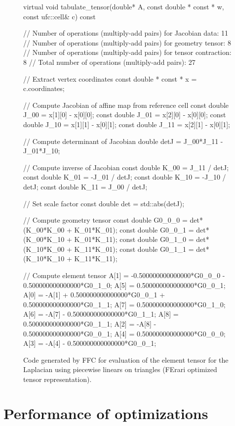 \begin{figure}
  \scriptsize
  \begin{code}
virtual void tabulate_tensor(double* A,
                             const double * const * w,
                             const ufc::cell& c) const
{
  // Number of operations (multiply-add pairs) for Jacobian data:      11
  // Number of operations (multiply-add pairs) for geometry tensor:    8
  // Number of operations (multiply-add pairs) for tensor contraction: 8
  // Total number of operations (multiply-add pairs):                  27

  // Extract vertex coordinates
  const double * const * x = c.coordinates;

  // Compute Jacobian of affine map from reference cell
  const double J_00 = x[1][0] - x[0][0];
  const double J_01 = x[2][0] - x[0][0];
  const double J_10 = x[1][1] - x[0][1];
  const double J_11 = x[2][1] - x[0][1];

  // Compute determinant of Jacobian
  double detJ = J_00*J_11 - J_01*J_10;

  // Compute inverse of Jacobian
  const double K_00 =  J_11 / detJ;
  const double K_01 = -J_01 / detJ;
  const double K_10 = -J_10 / detJ;
  const double K_11 =  J_00 / detJ;

  // Set scale factor
  const double det = std::abs(detJ);

  // Compute geometry tensor
  const double G0_0_0 = det*(K_00*K_00 + K_01*K_01);
  const double G0_0_1 = det*(K_00*K_10 + K_01*K_11);
  const double G0_1_0 = det*(K_10*K_00 + K_11*K_01);
  const double G0_1_1 = det*(K_10*K_10 + K_11*K_11);

  // Compute element tensor
  A[1] = -0.500000000000000*G0_0_0 - 0.500000000000000*G0_1_0;
  A[5] = 0.500000000000000*G0_0_1;
  A[0] = -A[1] + 0.500000000000000*G0_0_1 + 0.500000000000000*G0_1_1;
  A[7] = 0.500000000000000*G0_1_0;
  A[6] = -A[7] - 0.500000000000000*G0_1_1;
  A[8] = 0.500000000000000*G0_1_1;
  A[2] = -A[8] - 0.500000000000000*G0_0_1;
  A[4] = 0.500000000000000*G0_0_0;
  A[3] = -A[4] - 0.500000000000000*G0_0_1;
}
  \end{code}
  \caption{Code generated by FFC for evaluation of the element tensor
    for the Laplacian using piecewise linears on triangles (FErari
    optimized tensor representation).}
  \label{fig:code,poisson,optimized}
\end{figure}

\section{Performance of optimizations}

